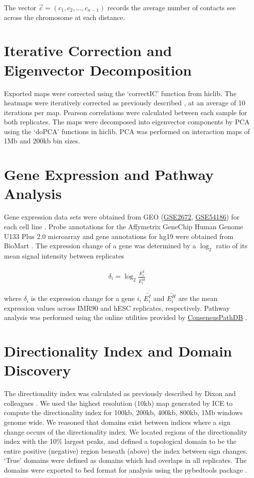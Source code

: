 The vector $\vec{c} = \left(c_1, c_2, \hdots, c_{n-1}\right)$ records the average number of contacts see across the chromosome
at each distance.

\section*{Iterative Correction and Eigenvector Decomposition}

Exported maps were corrected using the `correctIC' function from hiclib.  The heatmaps were iteratively corrected as previously
described \citep{imakaev2012}, at an average of 10 iterations per map.  Pearson correlations were calculated between each sample
for both replicates.  The maps were decomposed into eigenvector components by \gls{PCA} using the `doPCA' functions in hiclib.
\gls{PCA} was performed on interaction maps of 1Mb and 200kb bin sizes.

\section*{Gene Expression and Pathway Analysis}

Gene expression data sets were obtained from \gls{GEO} (\href{http://www.ncbi.nlm.nih.gov/geo/query/acc.cgi?acc=GSE2672}{GSE2672},
\href{http://www.ncbi.nlm.nih.gov/geo/query/acc.cgi?acc=GSE54186}{GSE54186}) for each cell line \citep{kim2005} \citep{kim2014}.  Probe
annotations for the Affymetrix GeneChip Human Genome U133 Plus 2.0 microarray and gene annotations for hg19 were obtained from
BioMart \citep{kasprzyk2011}.  The expression change of a gene was determined by a $\log_2$ ratio of its mean signal intensity between
replicates

\begin{align}
  \delta_i = \log_2{\frac{\bar{E_i^I}}{\bar{E_i^H}}}
\end{align}

where $\delta_i$ is the expression change for a gene $i$, $\bar{E_i^I}$ and $\bar{E_i^H}$ are the mean expression values across
IMR90 and hESC replicates, respectively.  Pathway analysis was performed using the online utilities provided by
\href{http://consensuspathdb.org/}{ConsensusPathDB} \citep{kamburov2012}.

\section*{Directionality Index and Domain Discovery}

The directionality index was calculated as previously described by Dixon and colleagues \citep{dixon2012}.  We used the highest
resolution (10kb) map generated by \gls{ICE} to compute the directionality index for 100kb, 200kb, 400kb, 800kb, 1Mb windows
genome wide.  We reasoned that domains exist between indices where a sign change occurs of the directionality index.  We located
regions of the directionality index with the 10\% largest peaks, and defined a topological domain to be the entire positive (negative)
region beneath (above) the index between sign changes.   `True' domains were defined as domains which had overlaps in all replicates.
The domains were exported to \.bed format for analysis using the pybedtools package \citep{quinlan2010,dale2011}.

